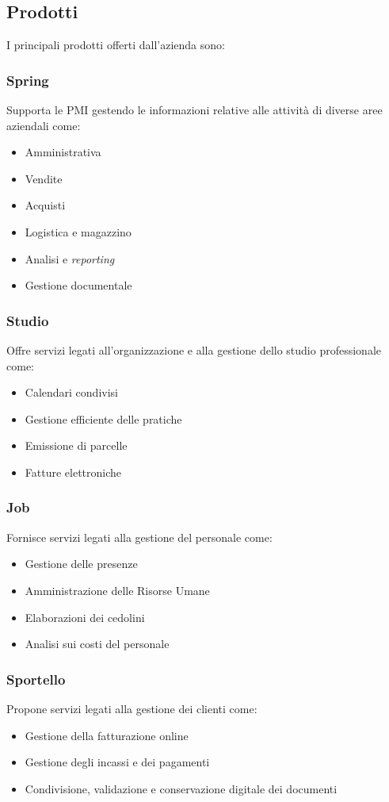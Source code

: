 \subsection{Prodotti}
I principali prodotti offerti dall'azienda sono: 

\subsubsection*{Spring}
Supporta le \gls{PMI} gestendo le informazioni relative alle attività di diverse aree aziendali come: 

\begin{itemize}
    \item Amministrativa 
    \item Vendite 
    \item Acquisti 
    \item Logistica e magazzino
    \item Analisi e \emph{reporting}
    \item Gestione documentale
\end{itemize}

\subsubsection*{Studio}
Offre servizi legati all'organizzazione e alla gestione dello studio professionale come:
\begin{itemize}
    \item Calendari condivisi  
    \item Gestione efficiente delle pratiche 
    \item Emissione di parcelle  
    \item Fatture elettroniche 
\end{itemize}

\subsubsection*{Job}
Fornisce servizi legati alla gestione del personale come: 
\begin{itemize}
    \item Gestione delle presenze  
    \item Amministrazione delle Risorse Umane  
    \item Elaborazioni dei cedolini 
    \item Analisi sui costi del personale
\end{itemize}

\subsubsection*{Sportello}
Propone servizi legati alla gestione dei clienti come:  
\begin{itemize}
    \item Gestione della fatturazione online 
    \item Gestione degli incassi e dei pagamenti 
    \item Condivisione, validazione e conservazione digitale dei documenti  
\end{itemize}

